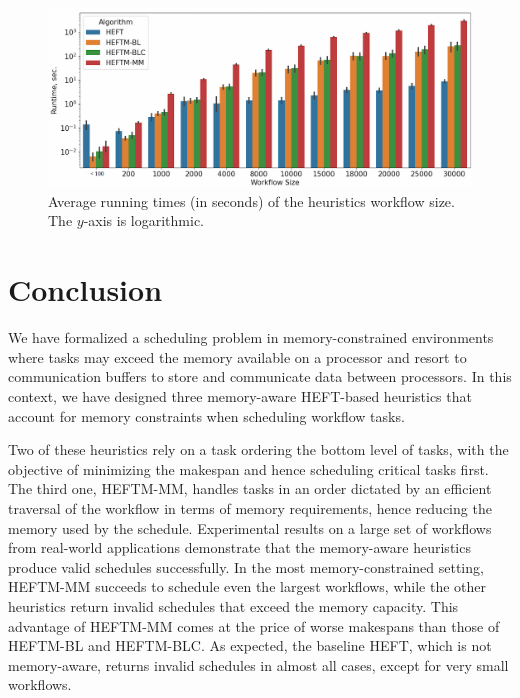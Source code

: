 \documentclass[conference]{IEEEtran}
\newcommand{\algo}[1]{\textsc{#1}}
\newcommand{\heft}{\algo{HEFT}\xspace}
\newcommand{\heftmm}{\algo{HEFTM-MM}\xspace}
\newcommand{\heftbl}{\algo{HEFTM-BL}\xspace}
\newcommand{\heftblc}{\algo{HEFTM-BLC}\xspace}
\begin{document}
\begin{figure}[tb]
    \centering
    \includegraphics[width=1\columnwidth] {images/runtimes-logarithmic2}
    \caption{Average running times (in seconds) of the heuristics \wrt workflow size. The $y$-axis is logarithmic.}
    \label{fig:runtimes-log}
\end{figure}




\bigskip
\section{Conclusion}
\label{sec:conc}

We have formalized a scheduling problem in memory-constrained environments where tasks
may exceed the memory available on a processor and resort to communication buffers
to store and communicate data between processors. In this context, we have 
designed three memory-aware HEFT-based heuristics that account for memory
constraints when scheduling workflow tasks. 

Two of these heuristics rely on a task ordering \wrt the bottom level of tasks, with the objective
of minimizing the makespan and hence scheduling critical tasks first. The third one, \heftmm,
handles tasks in an order dictated by an efficient traversal
of the workflow in terms of memory requirements, hence reducing the memory used
by the schedule. Experimental results on a large set of workflows from real-world applications
demonstrate that the memory-aware heuristics produce valid schedules successfully. 
In the most memory-constrained setting, \heftmm succeeds to schedule even the largest workflows,
while the other heuristics return invalid schedules that exceed the memory capacity. 
This advantage of \heftmm comes at the price of worse makespans than those of \heftbl
and \heftblc. %
As expected, the baseline \heft, which is not memory-aware, returns invalid schedules in almost
all cases, except for very small workflows. 
\end{document}
